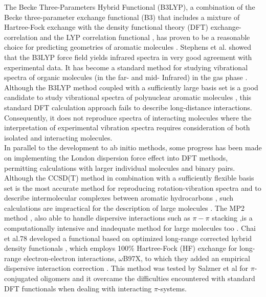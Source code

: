 The Becke Three-Parameters Hybrid Functional (B3LYP), a combination of the Becke three-parameter exchange functional (B3) \cite{becke1993density} that includes a mixture of Hartree-Fock exchange with the density functional theory (DFT) exchange-correlation and the LYP correlation functional \cite{lee1988development}, has proven to be a reasonable choice for predicting geometries of aromatic molecules \cite{bauschlicher1995comparison,tirado2008performance}.  Stephens et al. \cite{stephens1994ab} showed that the B3LYP force field yields infrared spectra in very good agreement with experimental data. It has become a standard method for studying vibrational spectra of organic molecules (in the far- and mid- Infrared) in the gas phase \cite{bauschlicher1997calculation,gohaud2005vibrational}. Although the B3LYP method coupled with a sufficiently large basis set is a good candidate to study vibrational spectra of polynuclear aromatic molecules \cite{michaelian2012far}, this standard DFT calculation approach fails to describe long-distance interactions. Consequently, it does not reproduce spectra of interacting molecules \cite{becke1993density,stephens1994ab,kristyan1994can,hobza1995density} where the interpretation of experimental vibration spectra requires consideration of both isolated and interacting molecules.\\

 In parallel to the development to ab initio methods, some progress has been made on implementing the London dispersion force effect into DFT methods, permitting calculations with larger individual molecules and binary pairs. Although the CCSD(T) method in combination with a sufficiently flexible basis set is the most accurate method for reproducing rotation-vibration spectra and to describe intermolecular complexes between aromatic hydrocarbons \cite{begue2006new}, such calculations are impractical for the description of large molecules \cite{begue2012nitrile}. The MP2 method \cite{pople1979derivative}, also able to handle dispersive interactions such as $\pi-\pi$ stacking \cite{chalasinski2000state,johnson2006structure},is a computationally intensive and inadequate method for large molecules too \cite{eilmes2012theoretical}. Chai et al.78  developed a functional based on optimized long-range corrected hybrid density functionals \cite{chai2008systematic}, which employs 100\% Hartree-Fock (HF) exchange for long-range electron-electron interactions, $\omega$B97X, to which they added an empirical dispersive interaction correction \cite{eilmes2012theoretica}. This method was tested by Salzner et al \cite{salzner2011improved} for $\pi$-conjugated oligomers and it overcame the difficulties encountered with standard DFT functionals when dealing with interacting $\pi$-systems.\\
 

